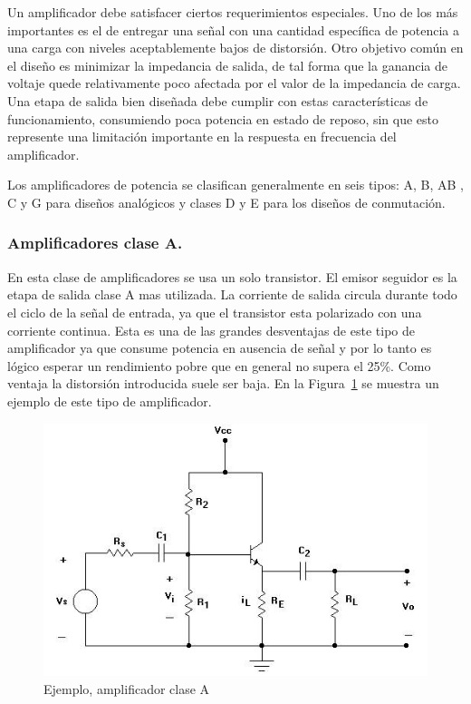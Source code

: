Un amplificador debe satisfacer ciertos requerimientos especiales. Uno de los más importantes es el de entregar una señal con una cantidad específica de potencia a una carga con niveles aceptablemente bajos de distorsión. Otro objetivo común en el diseño es minimizar la impedancia de salida, de tal forma que la ganancia de voltaje quede relativamente poco afectada por el valor de la impedancia de carga. Una etapa de salida bien diseñada debe cumplir con estas características de funcionamiento, consumiendo poca potencia en estado de reposo, sin que esto represente una limitación importante en la respuesta en frecuencia del amplificador. 
 

Los amplificadores de potencia  se clasifican generalmente en seis tipos: A, B, AB , C y G para diseños analógicos y clases D y E para los diseños de conmutación. 

\subsubsection*{Amplificadores clase A.}
\medskip 

En esta clase de amplificadores se usa un solo transistor. El emisor seguidor es la etapa de salida clase A mas utilizada. La corriente de salida circula durante todo el ciclo de la señal de entrada, ya que el transistor esta polarizado con una corriente continua. Esta es una de las grandes desventajas de este tipo de amplificador ya que consume potencia en ausencia de señal y por lo tanto es lógico esperar un rendimiento pobre que en general no supera el 25\%. Como ventaja la distorsión introducida suele ser baja. En la Figura~\ref{ampliA} se muestra un ejemplo de este tipo de amplificador.
 
\begin{figure}[H]
\centering
\includegraphics[scale=0.6]{img/ampliA.png}
\caption{Ejemplo, amplificador clase A}
\label{ampliA} 
\end{figure}

